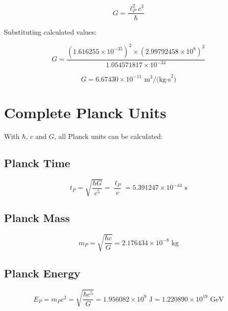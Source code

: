 \documentclass[12pt,a4paper]{article}
\theoremstyle{definition}
\begin{document}
	\begin{equation}
		G = \frac{\ell_P^2 c^3}{\hbar}
	\end{equation}
	
	Substituting calculated values:
	
	\begin{equation}
		G = \frac{(1.616255 \times 10^{-35})^2 \times (2.99792458 \times 10^8)^3}{1.054571817 \times 10^{-34}}
	\end{equation}
	
	\begin{tcolorbox}[colback=green!5!white,colframe=green!75!black,title=Gravitational Constant]
		\begin{equation}
			\boxed{G = 6.67430 \times 10^{-11} \text{ m}^3\text{/(kg·s}^2\text{)}}
		\end{equation}
	\end{tcolorbox}
	
	\section{Complete Planck Units}
	
	With $\hbar$, $c$ and $G$, all Planck units can be calculated:
	
	\subsection{Planck Time}
	
	\begin{equation}
		t_P = \sqrt{\frac{\hbar G}{c^5}} = \frac{\ell_P}{c} = 5.391247 \times 10^{-44} \text{ s}
	\end{equation}
	
	\subsection{Planck Mass}
	
	\begin{equation}
		m_P = \sqrt{\frac{\hbar c}{G}} = 2.176434 \times 10^{-8} \text{ kg}
	\end{equation}
	
	\subsection{Planck Energy}
	
	\begin{equation}
		E_P = m_P c^2 = \sqrt{\frac{\hbar c^5}{G}} = 1.956082 \times 10^9 \text{ J} = 1.220890 \times 10^{19} \text{ GeV}
	\end{equation}
	
\end{document}
